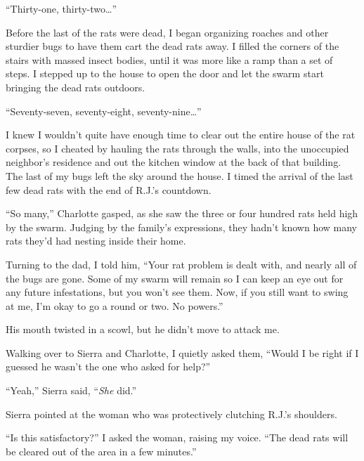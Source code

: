 ``Thirty-one, thirty-two\ldots''



Before the last of the rats were dead, I began organizing roaches and other sturdier bugs to have them cart the dead rats away.  I filled the corners of the stairs with massed insect bodies, until it was more like a ramp than a set of steps.  I stepped up to the house to open the door and let the swarm start bringing the dead rats outdoors.



``Seventy-seven, seventy-eight, seventy-nine\ldots''



I knew I wouldn't quite have enough time to clear out the entire house of the rat corpses, so I cheated by hauling the rats through the walls, into the unoccupied neighbor's residence and out the kitchen window at the back of that building.  The last of my bugs left the sky around the house.  I timed the arrival of the last few dead rats with the end of R.J.'s countdown.



``So many,'' Charlotte gasped, as she saw the three or four hundred rats held high by the swarm.  Judging by the family's expressions, they hadn't known how many rats they'd had nesting inside their home.



Turning to the dad, I told him, ``Your rat problem is dealt with, and nearly all of the bugs are gone.  Some of my swarm will remain so I can keep an eye out for any future infestations, but you won't see them.  Now, if you still want to swing at me, I'm okay to go a round or two.  No powers.''



His mouth twisted in a scowl, but he didn't move to attack me.



Walking over to Sierra and Charlotte, I quietly asked them, ``Would I be right if I guessed he wasn't the one who asked for help?''



``Yeah,'' Sierra said, ``\emph{She} did.''



Sierra pointed at the woman who was protectively clutching R.J.'s shoulders.



``Is this satisfactory?'' I asked the woman, raising my voice.  ``The dead rats will be cleared out of the area in a few minutes.''



